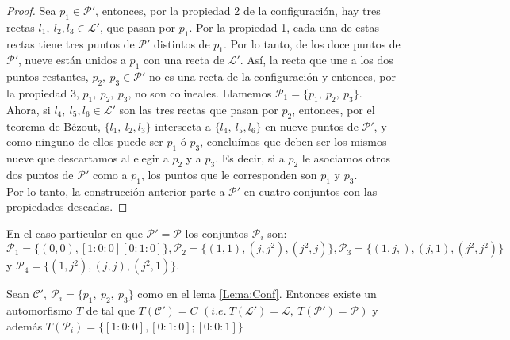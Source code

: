 \begin{proof}

  Sea $p_{1} \in \mathcal{P'}$, entonces, por la propiedad 2 de la configuración, hay tres rectas $\mathit{l}_{1},\ \mathit{l}_{2}, \mathit{l}_{3} \in \mathcal{L'}$, que pasan por $p_{1}$. Por la propiedad 1, cada una de estas rectas tiene tres puntos de $\mathcal{P'}$ distintos de $p_{1}$. Por lo tanto, de los doce puntos de $\mathcal{P'}$, nueve están unidos a $p_{1}$ con una recta de $\mathcal{L'}$. Así, la recta que une a los dos puntos restantes, $p_{2},\ p_{3} \in \mathcal{P'}$ no es una recta de la configuración y entonces, por la propiedad 3, $p_{1},\ p_{2},\ p_{3}$, no son colineales. Llamemos $\mathcal{P}_{1} = \{p_{1},\ p_{2},\ p_{3} \}$.
\\

Ahora, si $\mathit{l}_{4},\ \mathit{l}_{5}, \mathit{l}_{6} \in \mathcal{L'}$ son las tres rectas que pasan por $p_{2}$, entonces, por el teorema de Bézout, $\{ \mathit{l}_{1},\ \mathit{l}_{2}, \mathit{l}_{3} \}$ intersecta a  $\{ \mathit{l}_{4},\ \mathit{l}_{5}, \mathit{l}_{6} \}$ en nueve puntos de $\mathcal{P'}$, y como ninguno de ellos puede ser $p_{1}$ ó $p_{3}$, concluímos que deben ser los mismos nueve que descartamos al elegir a $p_{2}$ y a $p_{3}$. Es decir, si a $p_{2}$ le asociamos otros dos puntos de $\mathcal{P'}$ como a $p_{1}$, los puntos que le corresponden son $p_{1}$ y $p_{3}$.
\\

Por lo tanto, la construcción anterior parte a $\mathcal{P'}$ en cuatro conjuntos con las propiedades deseadas.

\end{proof}

En el caso particular en que $\mathcal{P}'=\mathcal{P}$ los conjuntos $\mathcal{P}_{i}$ son: $\mathcal{P}_{1}=\{ (0,0),[1:0:0][0:1:0]\}, \mathcal{P}_{2}=\{(1,1),(j,j^{2}),(j^{2},j)\}, \mathcal{P}_{3}=\{(1,j,),(j,1),(j^{2},j^{2})\}$ y $\mathcal{P}_{4}=\{(1,j^{2}),(j,j),(j^{2},1)\}$.\\


\begin{Proposicion}
\label{Prop:1}
Sean $\mathcal{C'},\ \mathcal{P}_{i} = \{p_{1},\ p_{2},\ p_{3} \}$ como en el lema \ref{Lema:Conf}. Entonces existe un automorfismo $T$ de \CP tal que $T(\mathcal{C'})=C$ $(\mathit{i.e.}\ T(\mathcal{L'}) = \mathcal{L},\ T(\mathcal{P'}) = \mathcal{P})$ y además $ T(\mathcal{P}_{i}) = \{ [1:0:0],[0:1:0];[0:0:1] \}$

\end{Proposicion}

